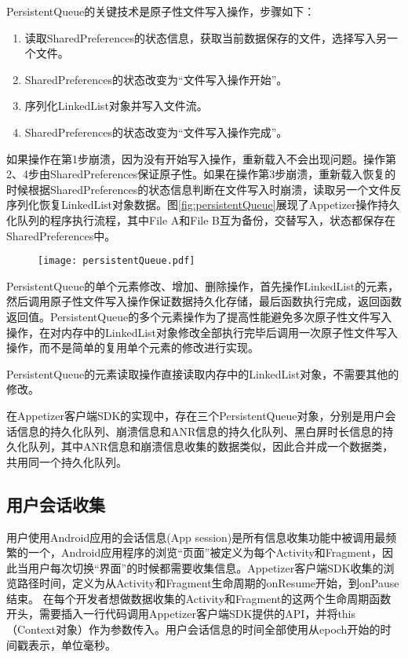 PersistentQueue的关键技术是原子性文件写入操作，步骤如下：

\begin{enumerate}
	\item 读取SharedPreferences的状态信息，获取当前数据保存的文件，选择写入另一个文件。
	\item SharedPreferences的状态改变为“文件写入操作开始”。
	\item 序列化LinkedList对象并写入文件流。
	\item SharedPreferences的状态改变为“文件写入操作完成”。
\end{enumerate} 

如果操作在第1步崩溃，因为没有开始写入操作，重新载入不会出现问题。操作第2、4步由SharedPreferences保证原子性。如果在操作第3步崩溃，重新载入恢复的时候根据SharedPreferences的状态信息判断在文件写入时崩溃，读取另一个文件反序列化恢复LinkedList对象数据。图\ref{fig:persistentQueue}展现了Appetizer操作持久化队列的程序执行流程，其中File A和File B互为备份，交替写入，状态都保存在SharedPreferences中。

\begin{figure}[!htp]
	\centering
	\texttt{[image: persistentQueue.pdf]}
\end{figure}

PersistentQueue的单个元素修改、增加、删除操作，首先操作LinkedList的元素，然后调用原子性文件写入操作保证数据持久化存储，最后函数执行完成，返回函数返回值。PersistentQueue的多个元素操作为了提高性能避免多次原子性文件写入操作，在对内存中的LinkedList对象修改全部执行完毕后调用一次原子性文件写入操作，而不是简单的复用单个元素的修改进行实现。

PersistentQueue的元素读取操作直接读取内存中的LinkedList对象，不需要其他的修改。

在Appetizer客户端SDK的实现中，存在三个PersistentQueue对象，分别是用户会话信息的持久化队列、崩溃信息和ANR信息的持久化队列、黑白屏时长信息的持久化队列，其中ANR信息和崩溃信息收集的数据类似，因此合并成一个数据类，共用同一个持久化队列。

\subsection{用户会话收集}
\label{subsec:sessionCollector}

用户使用Android应用的会话信息(App session)是所有信息收集功能中被调用最频繁的一个，Android应用程序的浏览“页面”被定义为每个Activity和Fragment，因此当用户每次切换“界面”的时候都需要收集信息。Appetizer客户端SDK收集的浏览路径时间，定义为从Activity和Fragment生命周期的onResume开始，到onPause结束。
在每个开发者想做数据收集的Activity和Fragment的这两个生命周期函数开头，需要插入一行代码调用Appetizer客户端SDK提供的API，并将this（Context对象）作为参数传入。用户会话信息的时间全部使用从epoch开始的时间戳表示，单位毫秒。

